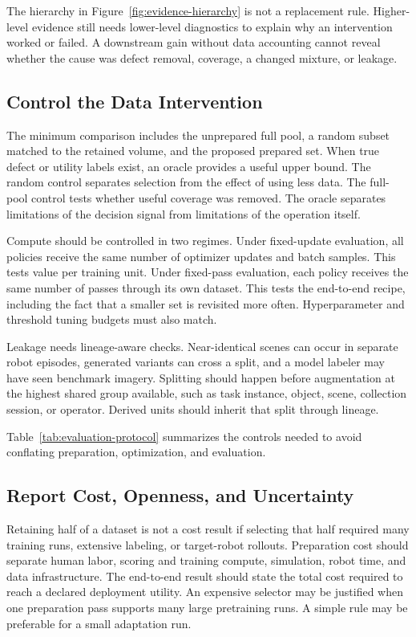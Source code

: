 The hierarchy in Figure~\ref{fig:evidence-hierarchy} is not a replacement rule. Higher-level evidence still needs lower-level diagnostics to explain why an intervention worked or failed. A downstream gain without data accounting cannot reveal whether the cause was defect removal, coverage, a changed mixture, or leakage.

\subsection{Control the Data Intervention}

The minimum comparison includes the unprepared full pool, a random subset matched to the retained volume, and the proposed prepared set. When true defect or utility labels exist, an oracle provides a useful upper bound. The random control separates selection from the effect of using less data. The full-pool control tests whether useful coverage was removed. The oracle separates limitations of the decision signal from limitations of the operation itself.

Compute should be controlled in two regimes. Under fixed-update evaluation, all policies receive the same number of optimizer updates and batch samples. This tests value per training unit. Under fixed-pass evaluation, each policy receives the same number of passes through its own dataset. This tests the end-to-end recipe, including the fact that a smaller set is revisited more often. Hyperparameter and threshold tuning budgets must also match.

Leakage needs lineage-aware checks. Near-identical scenes can occur in separate robot episodes, generated variants can cross a split, and a model labeler may have seen benchmark imagery. Splitting should happen before augmentation at the highest shared group available, such as task instance, object, scene, collection session, or operator. Derived units should inherit that split through lineage.

Table~\ref{tab:evaluation-protocol} summarizes the controls needed to avoid conflating preparation, optimization, and evaluation.



\subsection{Report Cost, Openness, and Uncertainty}

Retaining half of a dataset is not a cost result if selecting that half required many training runs, extensive labeling, or target-robot rollouts. Preparation cost should separate human labor, scoring and training compute, simulation, robot time, and data infrastructure. The end-to-end result should state the total cost required to reach a declared deployment utility. An expensive selector may be justified when one preparation pass supports many large pretraining runs. A simple rule may be preferable for a small adaptation run.

